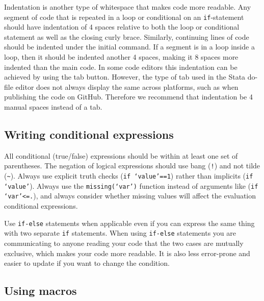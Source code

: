
\noindent Indentation is another type of whitespace that makes code more readable.
Any segment of code that is repeated in a loop or conditional on an
\texttt{if}-statement should have indentation of 4 spaces relative
to both the loop or conditional statement as well as the closing curly brace.
Similarly, continuing lines of code should be indented under the initial command.
If a segment is in a loop inside a loop, then it should be indented another 4 spaces,
making it 8 spaces more indented than the main code.
In some code editors this indentation can be achieved by using the tab button.
However, the type of tab used in the Stata do-file editor does not always display the same across platforms,
such as when publishing the code on GitHub.
Therefore we recommend that indentation be 4 manual spaces instead of a tab.


\subsection{Writing conditional expressions}

All conditional (true/false) expressions should be within at least one set of parentheses.
The negation of logical expressions should use bang (\texttt{!}) and not tilde (\texttt{\~}).
Always use explicit truth checks (\texttt{if `value'==1}) rather than implicits (\texttt{if `value'}).
Always use the \texttt{missing(`var')} function instead of arguments like (\texttt{if `var'<=.}),
and always consider whether missing values will affect the evaluation conditional expressions.


\noindent Use \texttt{if-else} statements when applicable
even if you can express the same thing with two separate \texttt{if} statements.
When using \texttt{if-else} statements you are communicating to anyone reading your code
that the two cases are mutually exclusive, which makes your code more readable.
It is also less error-prone and easier to update if you want to change the condition.


\subsection{Using macros}

